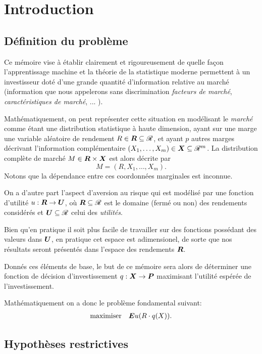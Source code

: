 \section{Introduction}

\subsection{Définition du problème}


Ce mémoire vise à établir clairement et rigoureusement de quelle façon l'apprentissage
machine et la théorie de la statistique moderne permettent à un investisseur doté d'une
grande quantité d'information relative au marché (information que nous appelerons sans
discrimination \textit{facteurs de marché}, \textit{caractéristiques de marché},
... \cit).

Mathématiquement, on peut représenter cette situation en modélisant le \textit{marché}
comme étant une distribution statistique à haute dimension, ayant sur une marge une
variable aléatoire de rendement $R \in \bm{R} \subseteq \mathscr{R}$, et ayant $p$ autres marges décrivant
l'information complémentaire $(X_1,\dots,X_m) \in \bm{X} \subseteq \mathscr{R}^m$. La distribution complète de
marché $M \in \bm{R} \times \bm{X}$ est alors décrite par
\begin{equation}
  M = (R,X_1,\dots,X_m).
\end{equation}
Notons que la dépendance entre ces coordonnées marginales est inconnue.

On a d'autre part l'aspect d'aversion au risque qui est modélisé par une fonction
d'utilité $u:\bm{R}\to\bm{U}$, où $\bm{R} \subseteq \mathscr{R}$ est le domaine (fermé ou non) des rendements considérés
et $\bm{U} \subseteq \mathscr{R}$ celui des \textit{utilités}.

Bien qu'en pratique il soit plus facile de travailler sur des fonctions possédant des
valeurs dans $\bm{U}$, en pratique cet espace est adimensionel\cit, de sorte que nos résultats
seront présentés dans l'espace des rendements $\bm{R}$.

Donnés ces éléments de base, le but de ce mémoire sera alors de déterminer une fonction de
décision d'investissement $q: \bm{X} \to \bm{P}$ maximisant l'utilité espérée de l'investissement. 

Mathématiquement on a donc le problème fondamental suivant:
\begin{equation}
  \begin{array}{ll}\operatorname*{maximiser} & \displaystyle{\bm Eu(R \cdot q(X)).}\end{array}
\end{equation}

\subsection{Hypothèses restrictives}




